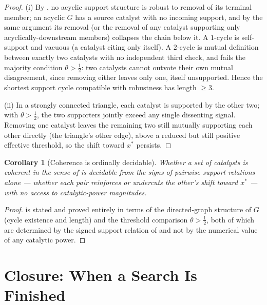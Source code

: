 \documentclass[11pt,twocolumn,a4paper]{article}
\theoremstyle{thmstyle}
\newtheorem{corollary}[theorem]{Corollary}
\theoremstyle{definition}
\theoremstyle{remark}
\begin{document}
\begin{proof}
(i) By , no acyclic support structure is robust to
removal of its terminal member; an acyclic $G$ has a source catalyst with
no incoming support, and by the same argument its removal (or the removal
of any catalyst supporting only acyclically-downstream members) collapses
the chain below it. A $1$-cycle is self-support and vacuous (a catalyst
citing only itself). A $2$-cycle is mutual definition between exactly two
catalysts with no independent third check, and fails the majority
condition $\theta>\tfrac12$: two catalysts cannot outvote their own mutual
disagreement, since removing either leaves only one, itself unsupported.
Hence the shortest support cycle compatible with robustness has length
$\ge3$.

(ii) In a strongly connected triangle, each catalyst is supported by the
other two; with $\theta>\tfrac12$, the two supporters jointly exceed any
single dissenting signal. Removing one catalyst leaves the remaining two
still mutually supporting each other directly (the triangle's other edge),
above a reduced but still positive effective threshold, so the shift
toward $x^{\ast}$ persists.
\end{proof}

\begin{corollary}[Coherence is ordinally decidable]
\label{cor:decide}
Whether a set of catalysts is coherent in the sense of
 is decidable from the \emph{signs} of pairwise support
relations alone --- whether each pair reinforces or undercuts the other's
shift toward $x^{\ast}$ --- with no access to catalytic-power magnitudes.
\end{corollary}

\begin{proof}
 is stated and proved entirely in terms of the
directed-graph structure of $G$ (cycle existence and length) and the
threshold comparison $\theta>\tfrac12$, both of which are determined by
the signed support relation of  and not by the
numerical value of any catalytic power.
\end{proof}

\section{Closure: When a Search Is Finished}
\label{sec:closure}
\end{document}

